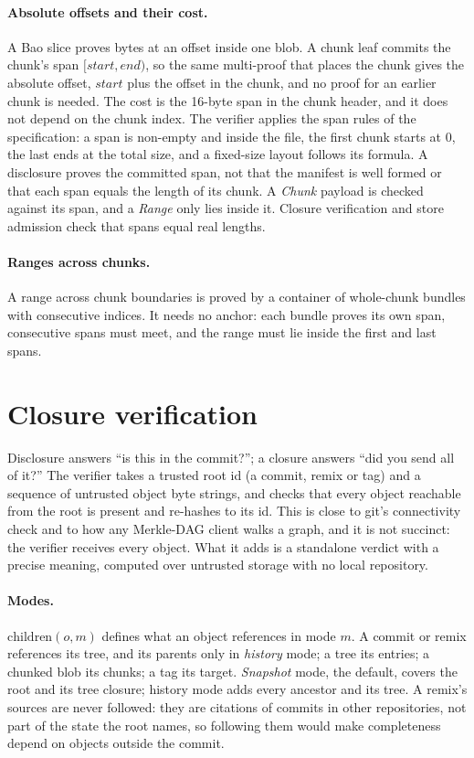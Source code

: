 \documentclass[10pt,letterpaper]{article}
\theoremstyle{remark}
\begin{document}
\paragraph{Absolute offsets and their cost.}
A Bao slice proves bytes at an offset inside one blob. A chunk leaf commits the
chunk's span $[\mathit{start}, \mathit{end})$, so the same multi-proof that
places the chunk gives the absolute offset, $\mathit{start}$ plus the offset in
the chunk, and no proof for an earlier chunk is needed. The cost is the
16-byte span in the chunk header, and it does not depend on the chunk index. The
verifier applies the span rules of the specification: a span is non-empty and
inside the file, the first chunk starts at 0, the last ends at the total size,
and a fixed-size layout follows its formula. A disclosure proves the committed
span, not that the manifest is well formed or that each span equals the length
of its chunk. A \emph{Chunk} payload is checked against its span, and a
\emph{Range} only lies inside it. Closure verification and store admission
check that spans equal real lengths.

\paragraph{Ranges across chunks.}
A range across chunk boundaries is proved by a container of whole-chunk bundles
with consecutive indices. It needs no anchor: each bundle proves its own span,
consecutive spans must meet, and the range must lie inside the first and last
spans.

\section{Closure verification}\label{sec:closure}

Disclosure answers ``is this in the commit?''; a closure answers ``did you send
all of it?'' The verifier takes a trusted root id (a
commit, remix or tag) and a sequence of untrusted object byte strings, and
checks that every object reachable from the root is present and re-hashes
to its id. This is close to git's connectivity check and to how any Merkle-DAG
client walks a graph, and it is not succinct: the verifier receives every
object. What it adds is a standalone verdict with a precise meaning, computed
over untrusted storage with no local repository.

\paragraph{Modes.}
$\mathrm{children}(o, m)$ defines what an object references in mode $m$. A
commit or remix references its tree, and its parents only in \emph{history}
mode; a tree its entries; a chunked blob its chunks; a tag its target.
\emph{Snapshot} mode, the default, covers the root and its tree closure;
history mode adds every ancestor and its tree. A remix's sources are never
followed: they are citations of commits in other repositories, not part of the
state the root names, so following them would make completeness depend on
objects outside the commit.
\end{document}
